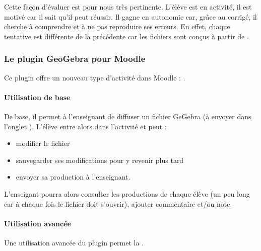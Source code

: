 \documentclass[letterpaper,10pt,french]{sphinxmanual}
\begin{document}
Cette façon d’évaluer est pour nous très pertinente.
L’élève est en activité, il est motivé car il sait qu’il peut réussir.
Il gagne en autonomie car, grâce au corrigé, il cherche à comprendre et à ne pas reproduire ses erreurs.
En effet, chaque tentative est différente de la précédente car les fichiers sont conçus à partir de .


\subsubsection{Le plugin GeoGebra pour Moodle}
\label{\detokenize{projet-description:le-plugin-geogebra-pour-moodle}}
Ce plugin offre un nouveau type d’activité dans Moodle : .


\paragraph{Utilisation de base}
\label{\detokenize{projet-description:utilisation-de-base}}
De base, il permet à l’enseignant de diffuser un fichier GeGebra (à envoyer dans l’onglet ).
L’élève entre alors dans l’activité et peut :
\begin{itemize}
\item {} 
modifier le fichier

\item {} 
sauvegarder ses modifications pour y revenir plus tard

\item {} 
envoyer sa production à l’enseignant.

\end{itemize}

L’enseigant pourra alors consulter les productions de chaque élève (un peu long car à chaque fois le fichier doit s’ouvrir), ajouter commentaire et/ou note.


\paragraph{Utilisation avancée}
\label{\detokenize{projet-description:utilisation-avancee}}
Une utilisation avancée du plugin permet la .
\end{document}
